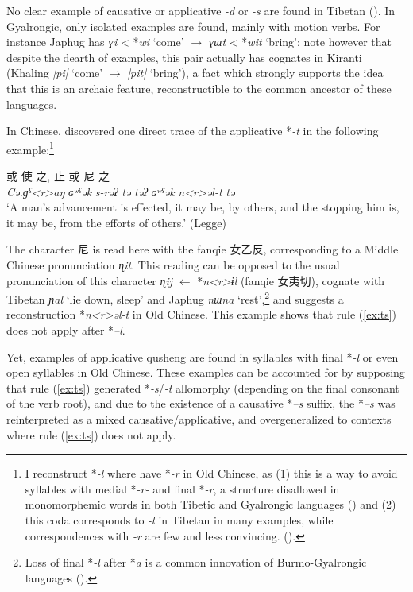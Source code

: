 \documentclass[oneside,a4paper,11pt]{article}
\newcommand{\ipa}[1]{{\phon\textit{\mbox{#1}}}}
\newcommand{\zh}[1]{{\cn#1}}
\begin{document}
No clear example of causative or applicative \ipa{-d} or \ipa{-s} are found in Tibetan (\citealt[630]{hill14derivational}). In Gyalrongic, only isolated examples are found, mainly with motion verbs. For instance Japhug has \ipa{ɣi} < *\ipa{wi} `come' $\rightarrow$ \ipa{ɣɯt} <  *\ipa{wit} `bring'; note however that despite  the dearth of examples, this pair actually has cognates in Kiranti (Khaling \ipa{|pi|} `come' $\rightarrow$ \ipa{|pit|} `bring'), a fact which strongly supports the idea that this is an archaic feature, reconstructible to the common ancestor of these languages.

In Chinese, \citet{sagart04directions} discovered one direct trace of the applicative *\ipa{-t}  in the following example:\footnote{I reconstruct *\ipa{-l} where \citet{bs14oc} have *\ipa{-r} in Old Chinese, as (1) this is a way to avoid syllables with medial *\ipa{-r-} and final *\ipa{-r}, a structure disallowed in monomorphemic words in both Tibetic and Gyalrongic languages (\citealt{jacques04these}) and (2) this coda corresponds to \ipa{-l}  in Tibetan in many examples, while correspondences with \ipa{-r} are few and less convincing. (\citealt[101-2]{hill14jrn}).  } 

 

\begin{exe}
\ex 
\gll \zh{行} \zh{或} \zh{使} \zh{之}, \zh{止} \zh{或} \zh{尼} \zh{之} \\
 \ipa{Cə.ɡˁ<r>aŋ}  \ipa{ɢʷˁək}  \ipa{s-rəʔ}  \ipa{tə}  \ipa{təʔ}  \ipa{ɢʷˁək}  \ipa{n<r>əl-t}  \ipa{tə} \\
\glt `A man's advancement is effected, it may be, by others, and the stopping him is, it may be, from the efforts of others.' (Legge)
\end{exe}

The character \zh{尼} is read here with the fanqie \zh{女乙反}, corresponding to a Middle Chinese pronunciation \ipa{ɳit}. This reading can be opposed to the usual pronunciation of this character \ipa{ɳij} $\leftarrow$ *\ipa{n<r>ɨl}  (fanqie \zh{女夷切}), cognate with Tibetan \ipa{ɲal} `lie down, sleep' and Japhug \ipa{nɯna} `rest',\footnote{Loss of final *\ipa{-l} after *\ipa{a} is a common innovation of Burmo-Gyalrongic languages (\citealt{jacques.michaud11naish}).} and suggests a reconstruction *\ipa{n<r>əl-t} in Old Chinese. This example shows that rule (\ref{ex:ts}) does not apply after *\ipa{--l}.

 Yet, examples of  applicative qusheng are found in syllables with final *\ipa{-l} or even open syllables in Old Chinese. These examples can be accounted for by supposing that rule (\ref{ex:ts}) generated *\ipa{-s}/\ipa{-t} allomorphy (depending on the final consonant of the verb root), and due to the existence of a causative *\ipa{--s} suffix, the *\ipa{--s} was reinterpreted as a mixed causative/applicative, and overgeneralized to contexts where rule (\ref{ex:ts}) does not apply.
 
\end{document}
